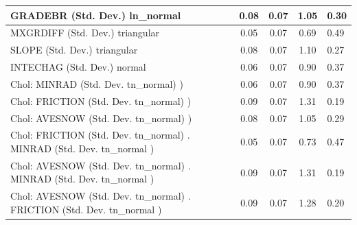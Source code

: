 \begin{table}
\begin{center}
\begin{tabular}{|l|l|c|c|c|l|}
			\hline
			GRADEBR (Std. Dev.) ln_normal &  & 0.08 & 0.07 & 1.05 & 0.30 \\
			\hline
			MXGRDIFF (Std. Dev.) triangular &  & 0.05 & 0.07 & 0.69 & 0.49 \\
			\hline
			SLOPE (Std. Dev.) triangular &  & 0.08 & 0.07 & 1.10 & 0.27 \\
			\hline
			INTECHAG (Std. Dev.) normal &  & 0.06 & 0.07 & 0.90 & 0.37 \\
			\hline
			 Chol: MINRAD (Std. Dev. tn_normal) ) &  & 0.06 & 0.07 & 0.90 & 0.37 \\
			\hline
			 Chol: FRICTION (Std. Dev. tn_normal) ) &  & 0.09 & 0.07 & 1.31 & 0.19 \\
			\hline
			 Chol: AVESNOW (Std. Dev. tn_normal) ) &  & 0.08 & 0.07 & 1.05 & 0.29 \\
			\hline
			 Chol: FRICTION (Std. Dev. tn_normal) . MINRAD (Std. Dev.   tn_normal ) &  & 0.05 & 0.07 & 0.73 & 0.47 \\
			\hline
			 Chol: AVESNOW (Std. Dev. tn_normal) . MINRAD (Std. Dev.   tn_normal ) &  & 0.09 & 0.07 & 1.31 & 0.19 \\
			\hline
			 Chol: AVESNOW (Std. Dev. tn_normal) . FRICTION (Std. Dev.   tn_normal ) &  & 0.09 & 0.07 & 1.28 & 0.20 \\
			\hline
		\end{tabular}
	\end{center}
\end{table}